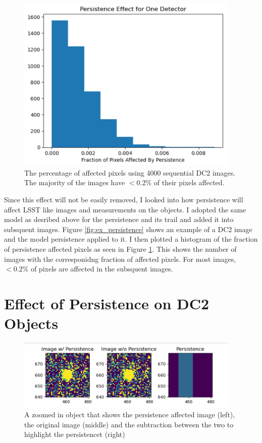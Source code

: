 \documentclass[DM,authoryear,toc]{lsstdoc}
\begin{document}
\begin{figure}[!htp]
  \centering
  \includegraphics[width=0.95\textwidth, angle=0]{DC2_percent_affected_pixels.png}
  \caption{
  The percentage of affected pixels using 4000 sequential DC2 images. The majority of the images have $<0.2\%$ of their pixels affected. 
  }\label{fig:affected_pixels}
\end{figure}


Since this effect will not be easily removed, I looked into how persistence will affect LSST like images and measurements on the objects. 
I adopted the same model as desribed above for the persistence and its trail and added it into subsquent images. 
Figure \ref{fig:ex_persistence} shows an example of a DC2 image and the model persistence applied to it. 
I then plotted a histogram of the fraction of persistence affected pixels as seen in Figure \ref{fig:affected_pixels}. 
This shows the number of images with the corresponidng fraction of affected pixels. 
For most images, $<0.2\%$ of pixels are affected in the subsquent images.


\section{Effect of Persistence on DC2 Objects}

\begin{figure}[!htp]
  \centering
  \includegraphics[width=0.95\textwidth, angle=0]{Obj_pers.png}
  \caption{
  A zoomed in object that shows the persistence affected image (left), the original image (middle) 
  and the subtraction between the two to highlight the persistencet (right)
  }\label{fig:obj_persistence}
\end{figure}
\end{document}
